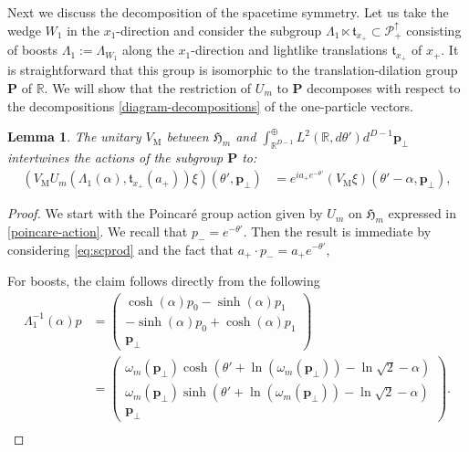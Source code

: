 \documentclass[12pt]{article}
\def\RR{{\mathbb R}}
\def\P{{\mathcal P}}
\def\a{\alpha}
\def\hm{\mathfrak{H}_m}
\def\poincare{{\P^\uparrow_+}}
\def\tp{\pmb{p}}
\newtheorem{lemma}[theorem]{Lemma}
\theoremstyle{remark}
\begin{document}
Next we discuss the decomposition of the spacetime symmetry.
Let us take the wedge $W_1$ in the $x_1$-direction and consider the subgroup
$\Lambda_{1}\ltimes \mathfrak{t}_{x_+}\subset  \poincare$ consisting of boosts $\Lambda_{1}:=\Lambda_{W_1}$ along the $x_1$-direction and
lightlike translations $\mathfrak{t}_{x_+}$ of $x_+$.
It is straightforward that this group is isomorphic to the translation-dilation group $\mathbf{P}$ of $\RR$.
We will show that the restriction of $U_m$ to $\mathbf{P}$ decomposes with respect to the decompositions
\eqref{diagram-decompositions} of the one-particle vectors.

\begin{lemma}\label{action-momentum-decomp}
 The unitary $V_{\mathrm M}$ between $\hm$ and $\int_{\RR^{D-1}}^\oplus L^2(\RR,d\theta') d^{D-1}\tp_\perp$
 intertwines the actions of the subgroup $\mathbf{P}$ to:
 \begin{align}\label{eq:U_m-momentumdecomp}
(V_{\mathrm M} U_m(\Lambda_{1}(\alpha),\mathfrak{t}_{x_+}(a_+))\xi)(\theta',\tp_\perp)&= e^{i  a_+e^{-\theta'} }(V_{\mathrm M}\xi)(\theta'-\alpha,\tp_\perp),
 \end{align}
\end{lemma}
\begin{proof}
We start with the Poincar\'e group action given by $U_m$ on $\hm$ expressed in \eqref{poincare-action}.
We recall that $p_-= e^{-\theta'}$. 
Then the result is immediate by considering \eqref{eq:scprod} and the fact that $a_+\cdot p_- =a_+e^{-\theta'} $,

For boosts, the claim follows directly from the following
       \begin{align*}
     \Lambda_{1}^{-1}(\a)p&=\left(\begin{array}{c}
     \cosh(\alpha )p_0 - \sinh(\alpha)p_1 \\
     -\sinh(\alpha)p_0+\cosh(\alpha)p_1\\
     \tp_\perp
     \end{array}  \right) \\
     &= \left(\begin{array}{c}
     \omega_m(\tp_\perp) \cosh(\theta'+\ln(\omega_m(\tp_\perp)) - \ln\sqrt 2- \alpha) \\
     \omega_m(\tp_\perp)\sinh(\theta'+\ln(\omega_m(\tp_\perp))- \ln\sqrt 2-\alpha)\\
     \tp_\perp
     \end{array}  \right).\nonumber \\
        \end{align*}
  \end{proof}
\end{document}
